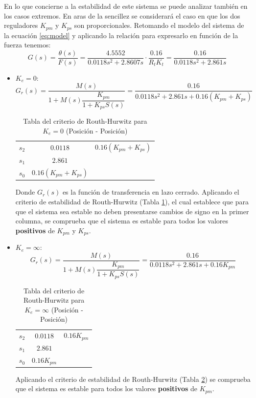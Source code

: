 En lo que concierne a la estabilidad de este sistema se puede analizar también en los casos extremos. En aras de la sencillez se considerará el caso en que los dos reguladores $K_{pm}$ y $K_{ps}$ son proporcionales.
Retomando el modelo del sistema de la ecuación \eqref{eq:model} y aplicando la relación para expresarlo en función de la fuerza tenemos:
\begin{equation}
G(s) = \dfrac{\theta(s)}{F(s)} = \dfrac{4.5552}{0.0118s^2 + 2.8607s}\cdot \dfrac{0.16}{R_tK_t} = \dfrac{0.16}{0.0118 s^2 + 2.861 s}
\end{equation}
\begin{itemize}
\item $K_e = 0$:
\begin{equation}
G_r(s) = \dfrac{M(s)}{1 + M(s)\dfrac{K_{pm}}{1 + K_{ps}S(s)}} = \dfrac{0.16}{0.0118 s^2 + 2.861 s + 0.16(K_{pm} + K_{ps})}
\end{equation}
\begin{table}[htbp]
  \centering
  \caption{Tabla del criterio de Routh-Hurwitz para $K_e = 0$ (Posición - Posición)}
    \begin{tabular}{ccc}
    \toprule
    $s_2$	& $0.0118$		& $0.16(K_{pm} + K_{ps})$ \\
    $s_1$	& $2.861$		& 	\\
 	$s_0$	& $0.16(K_{pm} + K_{ps})$		& 	\\
    \bottomrule
    \end{tabular}
  \label{tab:routh-pos-pos0}
\end{table}
Donde $G_r(s)$ es la función de transferencia en lazo cerrado. Aplicando el criterio de estabilidad de Routh-Hurwitz (Tabla \ref{tab:routh-pos-pos0}), el cual establece que para que el sistema sea estable no deben presentarse cambios de signo en la primer columna, se comprueba que el sistema es estable para todos los valores \textbf{positivos} de $K_{pm}$ y $K_{ps}$.

\item $K_e = \infty$:
\begin{equation}
G_r(s) = \dfrac{M(s)}{1 + M(s)\dfrac{K_{pm}}{1 + K_{ps}S(s)}} = \dfrac{0.16}{0.0118 s^2 + 2.861 s + 0.16K_{pm}}
\end{equation}
\begin{table}[htbp]
  \centering
    \caption{Tabla del criterio de Routh-Hurwitz para $K_e = \infty$ (Posición - Posición)}
    \begin{tabular}{ccc}
    \toprule
    $s_2$	& $0.0118$		& $0.16K_{pm}$ \\
    $s_1$	& $2.861$		& 	\\
 	$s_0$	& $0.16K_{pm}$		& 	\\
    \bottomrule
    \end{tabular}%
  \label{tab:routh-pos-pos1}%
\end{table}%
Aplicando el criterio de estabilidad de Routh-Hurwitz (Tabla \ref{tab:routh-pos-pos1}) se comprueba que el sistema es estable para todos los valores \textbf{positivos} de $K_{pm}$.
\end{itemize}

